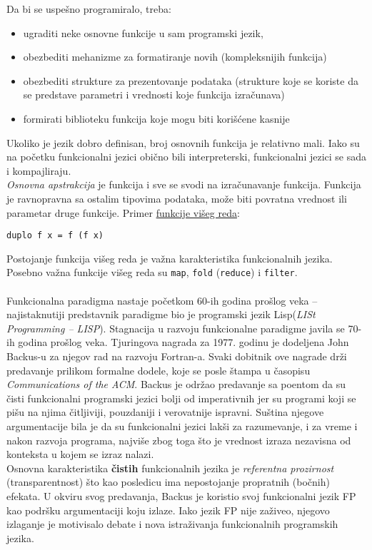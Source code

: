 \documentclass[../main.tex]{subfiles}
\begin{document}
Da bi se uspešno programiralo, treba:
\begin{itemize}
\item ugraditi neke osnovne funkcije u sam programski jezik,
\item obezbediti mehanizme za formatiranje novih (kompleksnijih funkcija)
\item obezbediti strukture za prezentovanje podataka (strukture koje se koriste da se predstave parametri i vrednosti koje funkcija izračunava)
\item formirati biblioteku funkcija koje mogu biti korišćene kasnije
\end{itemize}
Ukoliko je jezik dobro definisan, broj osnovnih funkcija je relativno mali. Iako su na početku funkcionalni jezici obično bili interpreterski, funkcionalni jezici se sada i kompajliraju. 
\\
{\it Osnovna apstrakcija} je funkcija i sve se svodi na izračunavanje funkcija. Funkcija je ravnopravna sa ostalim tipovima podataka, može biti povratna vrednost ili parametar druge funkcije. Primer \underline{funkcije višeg reda}:
\begin{Verbatim}
duplo f x = f (f x)
\end{Verbatim}
Postojanje funkcija višeg reda je važna karakteristika funkcionalnih jezika. Posebno važna funkcije višeg reda su \texttt{map}, \texttt{fold} (\texttt{reduce}) i \texttt{filter}.
\\ \\
\indent Funkcionalna paradigma nastaje početkom 60-ih godina prošlog veka -- najistaknutiji predstavnik paradigme bio je programski jezik Lisp({\it LISt Programming -- LISP}). Stagnacija u razvoju funkcionalne paradigme javila se 70-ih godina prošlog veka. Tjuringova nagrada za 1977. godinu je dodeljena John Backus-u za njegov rad na razvoju Fortran-a. Svaki dobitnik ove nagrade drži predavanje prilikom formalne dodele, koje se posle štampa u časopisu {\it Communications of the ACM}. Backus je održao predavanje sa poentom da su čisti funkcionalni programski jezici bolji od imperativnih jer su programi koji se pišu na njima čitljiviji, pouzdaniji i verovatnije ispravni. Suština njegove argumentacije bila je da su funkcionalni jezici lakši za razumevanje, i za vreme i nakon razvoja programa, najviše zbog toga što je vrednost izraza nezavisna od konteksta u kojem se izraz nalazi.
\\
Osnovna karakteristika {\bf čistih} funkcionalnih jezika je {\it referentna prozirnost} (transparentnost) što kao posledicu ima nepostojanje propratnih (bočnih) efekata. U okviru svog predavanja, Backus je koristio svoj funkcionalni jezik FP kao podršku argumentaciji koju izlaze. Iako jezik FP nije zaživeo, njegovo izlaganje je motivisalo debate i nova istraživanja funkcionalnih programskih jezika.
\end{document}
